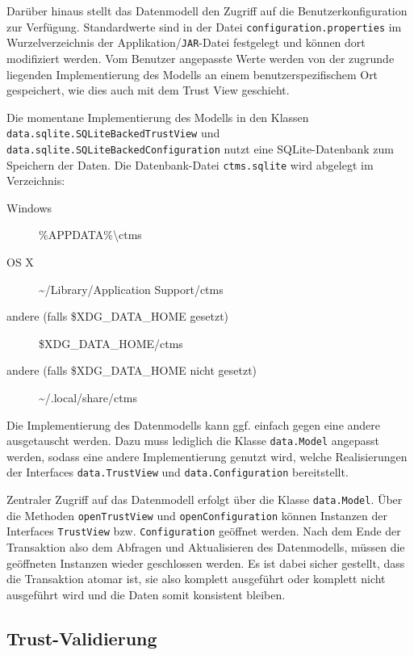 \documentclass[accentcolor=tud1c,article,colorback,11pt]{tudreport}
\begin{document}
Darüber hinaus stellt das Datenmodell den Zugriff auf die Benutzerkonfiguration zur Verfügung. Standardwerte sind in der Datei \texttt{configuration.properties} im Wurzelverzeichnis der Applikation/\texttt{JAR}-Datei festgelegt und können dort modifiziert werden. Vom Benutzer angepasste Werte werden von der zugrunde liegenden Implementierung des Modells an einem benutzerspezifischem Ort gespeichert, wie dies auch mit dem Trust View geschieht.

Die momentane Implementierung des Modells in den Klassen \texttt{data.sqlite.SQLiteBackedTrustView} und \texttt{data.sqlite.SQLiteBackedConfiguration} nutzt eine SQLite-Datenbank zum Speichern der Daten. Die Datenbank-Datei \texttt{ctms.sqlite} wird abgelegt im Verzeichnis:
\vspace{1em}

\begin{minipage}{\textwidth}
\begin{description}
\item[Windows] \%APPDATA\%\textbackslash ctms
\item[OS X] \textasciitilde/Library/Application Support/ctms
\item[andere (falls \$XDG\_DATA\_HOME gesetzt)] \$XDG\_DATA\_HOME/ctms
\item[andere (falls \$XDG\_DATA\_HOME nicht gesetzt)] \textasciitilde/.local/share/ctms
\end{description}
\end{minipage}

Die Implementierung des Datenmodells kann ggf. einfach gegen eine andere ausgetauscht werden. Dazu muss lediglich die Klasse \texttt{data.Model} angepasst werden, sodass eine andere Implementierung genutzt wird, welche Realisierungen der Interfaces \texttt{data.TrustView} und \texttt{data.Configuration} bereitstellt.

Zentraler Zugriff auf das Datenmodell erfolgt über die Klasse \texttt{data.Model}. Über die Methoden \texttt{openTrustView} und \texttt{openConfiguration} können Instanzen der Interfaces \texttt{TrustView} bzw. \texttt{Configuration} geöffnet werden. Nach dem Ende der Transaktion also dem Abfragen und Aktualisieren des Datenmodells, müssen die geöffneten Instanzen wieder geschlossen werden. Es ist dabei sicher gestellt, dass die Transaktion atomar ist, sie also komplett ausgeführt oder komplett nicht ausgeführt wird und die Daten somit konsistent bleiben.

\subsection{Trust-Validierung}
\end{document}
